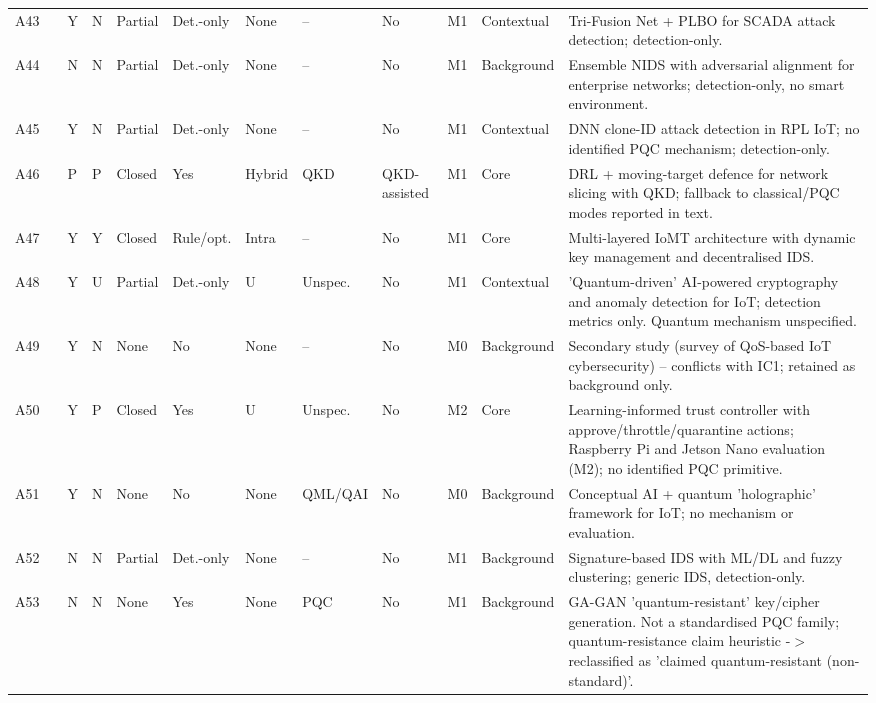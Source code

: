 {\begin{longtable}{p{0.43cm}p{0.8cm}p{0.3cm}p{0.4cm}p{0.8cm}p{0.75cm}p{0.65cm}p{0.8cm}p{0.8cm}p{0.45cm}p{1.1cm}p{4.95cm}}
A43 & \cite{KHADIDOS2025100782} & Y & N & Partial & Det.-only & None & -- & No & M1 & Contextual & Tri-Fusion Net + PLBO for SCADA attack detection; detection-only. \\
A44 & \cite{https://doi.org/10.1002/eng2.70419} & N & N & Partial & Det.-only & None & -- & No & M1 & Background & Ensemble NIDS with adversarial alignment for enterprise networks; detection-only, no smart environment. \\
A45 & \cite{https://doi.org/10.1049/cmu2.70067} & Y & N & Partial & Det.-only & None & -- & No & M1 & Contextual & DNN clone-ID attack detection in RPL IoT; no identified PQC mechanism; detection-only. \\
A46 & \cite{Andreou2025} & P & P & Closed & Yes & Hybrid & QKD & QKD-assisted & M1 & Core & DRL + moving-target defence for network slicing with QKD; fallback to classical/PQC modes reported in text. \\
A47 & \cite{Sharma2025} & Y & Y & Closed & Rule/opt. & Intra & -- & No & M1 & Core & Multi-layered IoMT architecture with dynamic key management and decentralised IDS. \\
A48 & \cite{Mujlid2025} & Y & U & Partial & Det.-only & U & Unspec. & No & M1 & Contextual & 'Quantum-driven' AI-powered cryptography and anomaly detection for IoT; detection metrics only. Quantum mechanism unspecified. \\
A49 & \cite{Sefati2025} & Y & N & None & No & None & -- & No & M0 & Background & Secondary study (survey of QoS-based IoT cybersecurity) -- conflicts with IC1; retained as background only. \\
A50 & \cite{Naik2025} & Y & P & Closed & Yes & U & Unspec. & No & M2 & Core & Learning-informed trust controller with approve/throttle/quarantine actions; Raspberry Pi and Jetson Nano evaluation (M2); no identified PQC primitive. \\
A51 & \cite{Alzahrani2025} & Y & N & None & No & None & QML/QAI & No & M0 & Background & Conceptual AI + quantum 'holographic' framework for IoT; no mechanism or evaluation. \\
A52 & \cite{Ahmed2025} & N & N & Partial & Det.-only & None & -- & No & M1 & Background & Signature-based IDS with ML/DL and fuzzy clustering; generic IDS, detection-only. \\
A53 & \cite{Singh2025} & N & N & None & Yes & None & PQC & No & M1 & Background & GA-GAN 'quantum-resistant' key/cipher generation. Not a standardised PQC family; quantum-resistance claim heuristic -$>$ reclassified as 'claimed quantum-resistant (non-standard)'. \\

\end{longtable}}
